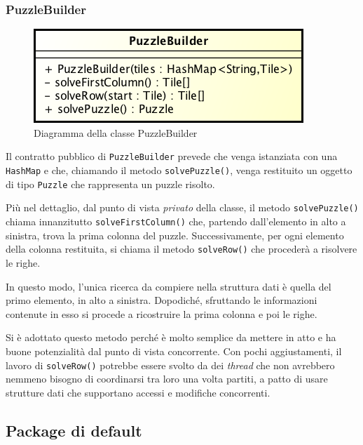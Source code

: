 \documentclass[a4paper, 12pt]{article}
\begin{document}
      \subsubsection{PuzzleBuilder}

        \begin{figure}[H]

          \centering
          \includegraphics[scale=0.7]{uml/puzzlebuilder.png}
          \caption{Diagramma della classe PuzzleBuilder}
          \label{uml:puzzlebuilder}

        \end{figure}

        Il contratto pubblico di \verb|PuzzleBuilder| prevede che venga istanziata con una \verb|HashMap| e che, chiamando il metodo \verb|solvePuzzle()|, venga restituito un oggetto di tipo \verb|Puzzle| che rappresenta un puzzle risolto.

        Più nel dettaglio, dal punto di vista \emph{privato} della classe, il metodo \verb|solvePuzzle()| chiama innanzitutto \verb|solveFirstColumn()| che, partendo dall'elemento in alto a sinistra, trova la prima colonna del puzzle. Successivamente, per ogni elemento della colonna restituita, si chiama il metodo \verb|solveRow()| che procederà a risolvere le righe.

        In questo modo, l'unica ricerca da compiere nella struttura dati è quella del primo elemento, in alto a sinistra. Dopodiché, sfruttando le informazioni contenute in esso si procede a ricostruire la prima colonna e poi le righe.

        Si è adottato questo metodo perché è molto semplice da mettere in atto e ha buone potenzialità dal punto di vista concorrente. Con pochi aggiustamenti, il lavoro di \verb|solveRow()| potrebbe essere svolto da dei \emph{thread} che non avrebbero nemmeno bisogno di coordinarsi tra loro una volta partiti, a patto di usare strutture dati che supportano accessi e modifiche concorrenti.

    \subsection{Package di default}
\end{document}
